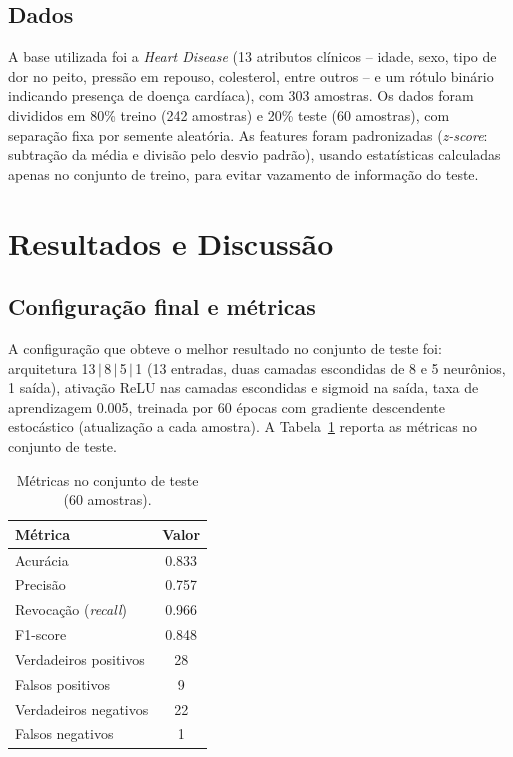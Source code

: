 \subsection{Dados}

A base utilizada foi a \textit{Heart Disease} (13 atributos clínicos --
idade, sexo, tipo de dor no peito, pressão em repouso, colesterol, entre
outros -- e um rótulo binário indicando presença de doença cardíaca), com
303 amostras. Os dados foram divididos em 80\% treino (242 amostras) e 20\%
teste (60 amostras), com separação fixa por semente aleatória. As features
foram padronizadas (\textit{z-score}: subtração da média e divisão pelo
desvio padrão), usando estatísticas calculadas apenas no conjunto de
treino, para evitar vazamento de informação do teste.

\section{Resultados e Discussão}

\subsection{Configuração final e métricas}

A configuração que obteve o melhor resultado no conjunto de teste foi:
arquitetura 13$\,|\,$8$\,|\,$5$\,|\,$1 (13 entradas, duas camadas escondidas
de 8 e 5 neurônios, 1 saída), ativação ReLU nas camadas escondidas e
sigmoid na saída, taxa de aprendizagem 0.005, treinada por 60 épocas com
gradiente descendente estocástico (atualização a cada amostra). A
Tabela~\ref{tab:metricas} reporta as métricas no conjunto de teste.

\begin{table}[htbp]
    \centering
    \caption{Métricas no conjunto de teste (60 amostras).}
    \label{tab:metricas}
    \begin{tabular}{lc}
        \toprule
        Métrica & Valor \\
        \midrule
        Acurácia  & 0.833 \\
        Precisão  & 0.757 \\
        Revocação (\textit{recall}) & 0.966 \\
        F1-score  & 0.848 \\
        \midrule
        Verdadeiros positivos & 28 \\
        Falsos positivos      & 9  \\
        Verdadeiros negativos & 22 \\
        Falsos negativos      & 1  \\
        \bottomrule
    \end{tabular}
\end{table}

